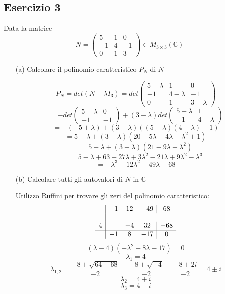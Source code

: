\documentclass[a4paper]{article}
\theoremstyle{break}
\theoremstyle{break}
\theoremstyle{break}
\theoremstyle{break}
\begin{document}
\subsection{Esercizio 3}
Data la matrice
\[
	N = \begin{pmatrix}
		5  & 1 & 0  \\
		-1 & 4 & -1 \\
		0  & 1 & 3
	\end{pmatrix}
	\in M_{3 \times 3}(\mathbb{C})
\]

\begin{enumerate}
	\item[(a)] Calcolare il polinomio caratteristico \( P_N \) di \( N \)

	      \vspace{1em}
	      \[
		      P_N = det(N - \lambda I_3) = det \begin{pmatrix}
			      5 - \lambda & 1           & 0           \\
			      -1          & 4 - \lambda & -1          \\
			      0           & 1           & 3 - \lambda
		      \end{pmatrix}
	      \]
	      \[
		      = - det \begin{pmatrix}
			      5 - \lambda & 0  \\
			      -1          & -1
		      \end{pmatrix}
		      + (3-\lambda) det \begin{pmatrix}
			      5 - \lambda & 1           \\
			      -1          & 4 - \lambda
		      \end{pmatrix}
	      \]
	      \[
		      = -(-5+\lambda) + (3-\lambda)((5-\lambda)(4-\lambda) + 1)
	      \]
	      \[
		      = 5 - \lambda + (3 - \lambda) (20 - 5 \lambda - 4 \lambda + \lambda^2 + 1)
	      \]
	      \[
		      = 5 - \lambda + (3 - \lambda) (21 - 9 \lambda + \lambda^2)
	      \]
	      \[
		      = 5 - \lambda + 63 - 27 \lambda + 3 \lambda^2 - 21 \lambda + 9 \lambda^2 - \lambda^3
	      \]
	      \[
		      = -\lambda^3 + 12 \lambda^2 - 49 \lambda + 68
	      \]

	\item[(b)] Calcolare tutti gli autovalori di \( N \) in \( \mathbb{C} \)

	      \vspace{1em}
	      Utilizzo Ruffini per trovare gli zeri del polinomio caratteristico:
	      \[
		      \begin{array}{c|ccc|c}
			        & -1 & 12 & -49 & 68  \\
			      \\
			      4 &    & -4 & 32  & -68 \\
			      \hline
			        & -1 & 8  & -17 & 0
		      \end{array}
	      \]
	      \[
		      (\lambda-4)(-\lambda^2 + 8\lambda - 17) = 0
	      \]
	      \[
		      \lambda_1 = 4
	      \]
	      \[
		      \lambda_{1,2} = \frac{-8 \pm \sqrt{64 - 68}}{-2} = \frac{-8 \pm \sqrt{-4}}{-2} = \frac{-8 \pm 2i}{-2} = 4 \pm i
	      \]
	      \[
		      \lambda_2 = 4 + i
	      \]
	      \[
		      \lambda_3 = 4 - i
	      \]


\end{enumerate}
\end{document}
